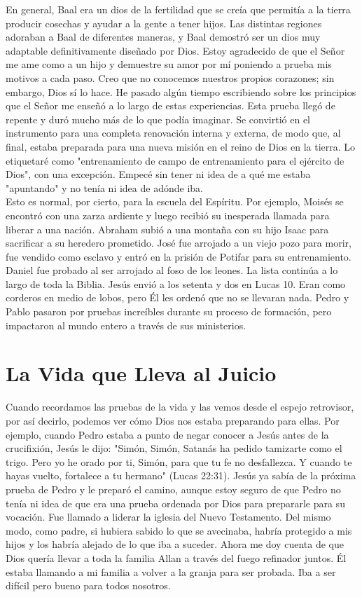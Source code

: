 \documentclass[twoside, 12pt]{book}
\begin{document}
En general, Baal era un dios de la fertilidad que se creía que permitía a la tierra producir cosechas y ayudar a la gente a tener hijos. Las distintas regiones adoraban a Baal de diferentes maneras, y Baal demostró ser un dios muy adaptable definitivamente diseñado por Dios. Estoy agradecido de que el Señor me ame como a un hijo y demuestre su amor por mí poniendo a prueba mis motivos a cada paso. Creo que no conocemos nuestros propios corazones; sin embargo, Dios sí lo hace. He pasado algún tiempo escribiendo sobre los principios que el Señor me enseñó a lo largo de estas experiencias. Esta prueba llegó de repente y duró mucho más de lo que podía imaginar. Se convirtió en el instrumento para una completa renovación interna y externa, de modo que, al final, estaba preparada para una nueva misión en el reino de Dios en la tierra. Lo etiquetaré como "entrenamiento de campo de entrenamiento para el ejército de Dios", con una excepción. Empecé sin tener ni idea de a qué me estaba "apuntando" y no tenía ni idea de adónde iba.\\

Esto es normal, por cierto, para la escuela del Espíritu. Por ejemplo, Moisés se encontró con una zarza ardiente y luego recibió su inesperada llamada para liberar a una nación. Abraham subió a una montaña con su hijo Isaac para sacrificar a su heredero prometido. José fue arrojado a un viejo pozo para morir, fue vendido como esclavo y entró en la prisión de Potifar para su entrenamiento. Daniel fue probado al ser arrojado al foso de los leones. La lista continúa a lo largo de toda la Biblia. Jesús envió a los setenta y dos en Lucas 10. Eran como corderos en medio de lobos, pero Él les ordenó que no se llevaran nada. Pedro y Pablo pasaron por pruebas increíbles durante su proceso de formación, pero impactaron al mundo entero a través de sus ministerios.\\

\section{La Vida que Lleva al Juicio}

Cuando recordamos las pruebas de la vida y las vemos desde el espejo retrovisor, por así decirlo, podemos ver cómo Dios nos estaba preparando para ellas. Por ejemplo, cuando Pedro estaba a punto de negar conocer a Jesús antes de la crucifixión, Jesús le dijo: "Simón, Simón, Satanás ha pedido tamizarte como el trigo. Pero yo he orado por ti, Simón, para que tu fe no desfallezca. Y cuando te hayas vuelto, fortalece a tu hermano" (Lucas 22:31). Jesús ya sabía de la próxima prueba de Pedro y le preparó el camino, aunque estoy seguro de que Pedro no tenía ni idea de que era una prueba ordenada por Dios para prepararle para su vocación. Fue llamado a liderar la iglesia del Nuevo Testamento. Del mismo modo, como padre, si hubiera sabido lo que se avecinaba, habría protegido a mis hijos y los habría alejado de lo que iba a suceder. Ahora me doy cuenta de que Dios quería llevar a toda la familia Allan a través del fuego refinador juntos. Él estaba llamando a mi familia a volver a la granja para ser probada. Iba a ser difícil pero bueno para todos nosotros.\\
\end{document}
